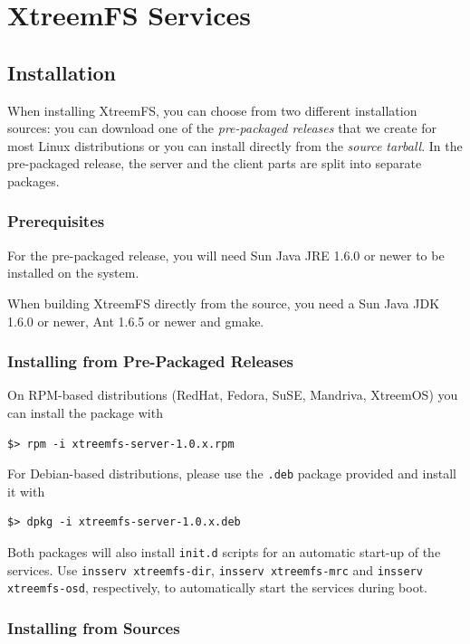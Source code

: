 \documentclass[a4paper,10pt]{book}
\begin{document}
\chapter{XtreemFS Services}

\section{Installation}

When installing XtreemFS, you can choose from two different installation sources: you can download one of the \emph{pre-packaged releases} that we create for most Linux distributions or you can install directly from the \emph{source tarball}. In the pre-packaged release, the server and the client parts are split into separate packages.

\subsection{Prerequisites}

For the pre-packaged release, you will need Sun Java JRE 1.6.0 or newer to be installed on the system.

When building XtreemFS directly from the source, you need a Sun Java JDK 1.6.0 or newer, Ant 1.6.5 or newer and gmake.

\subsection{Installing from Pre-Packaged Releases}

On RPM-based distributions (RedHat, Fedora, SuSE, Mandriva, XtreemOS) you can install the package with


\begin{verbatim}
$> rpm -i xtreemfs-server-1.0.x.rpm
\end{verbatim}


For Debian-based distributions, please use the \texttt{.deb} package provided and install it with


\begin{verbatim}
$> dpkg -i xtreemfs-server-1.0.x.deb
\end{verbatim}


Both packages will also install \texttt{init.d} scripts for an automatic start-up of the services. Use \texttt{insserv xtreemfs-dir}, \texttt{insserv xtreemfs-mrc} and \texttt{insserv xtreemfs-osd}, respectively, to automatically start the services during boot.

\subsection{Installing from Sources}
\end{document}
